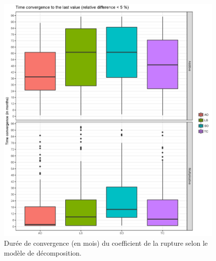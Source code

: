 \documentclass[12pt, a4paper, french]{article}
\begin{document}
\begin{figure}[!ht]
\begin{center}
 \includegraphics[scale=0.65]{img/OutliersConvergence.png}
 \caption{Durée de convergence (en mois) du coefficient de la rupture selon le modèle de décomposition.}
 \label{fig:OutliersConvergence}
\end{center}
\end{figure}
\end{document}
